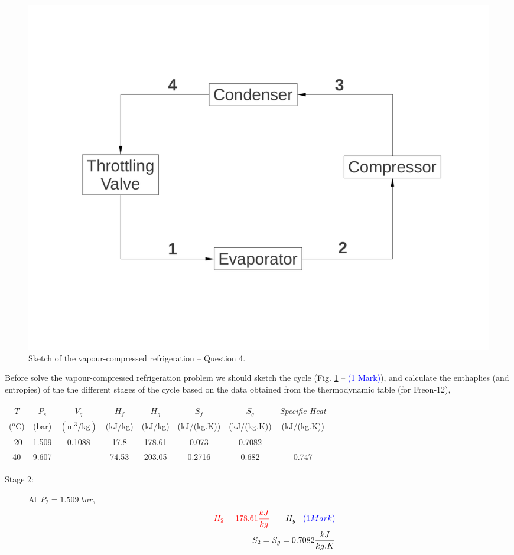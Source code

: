\documentclass[12pt,twoside]{report}
\newcommand{\frc}{\displaystyle\frac}
\begin{document}
\begin{description}
\begin{figure}[h]
\begin{center}
\includegraphics[width=10.cm,clip]{./Pics/Exam_Refrigeration2}
\caption{ Sketch of the vapour-compressed refrigeration -- Question 4.}
\label{exam_refrig2}
\end{center}
\end{figure}

Before solve the vapour-compressed refrigeration problem we should sketch the cycle (Fig. \ref{exam_refrig2} -- \textcolor{blue}{(1 Mark)}), and calculate the enthaplies (and entropies) of the the different stages of the cycle based on the data obtained from the thermodynamic table (for Freon-12),
\begin{center}
\begin{tabular}{|c c| c c c c c c| }
\hline
$T$             & $P_{s}$  & $V_{g}$  & $H_{f}$  & $H_{g}$   &  $S_{f}$   &  $S_{g}$   & {\it Specific Heat} \\
($^{\text{o}}$C)  & (bar)   & $\left(\text{m}^{3}/\text{kg}\right)$ & (kJ/kg) & (kJ/kg) & (kJ/(kg.K)) &  (kJ/(kg.K)) &   (kJ/(kg.K)) \\
\hline
-20   & 1.509 & 0.1088 & 17.8 & 178.61 & 0.073 & 0.7082 & -- \\
40    & 9.607 & --     & 74.53 & 203.05 & 0.2716 & 0.682 & 0.747 \\
\hline
\end{tabular}
\end{center}

\begin{description}
%
\item [Stage 2:] At $P_{2}=1.509\;bar$,
\begin{eqnarray}
&&\textcolor{red}{H_{2}=178.61\frc{kJ}{kg}}\;\;=H_{g}\;\;\;\textcolor{blue}{(1 Mark)} \nonumber \\
&&S_{2}=S_{g}=0.7082 \frc{kJ}{kg.K} \nonumber 
\end{eqnarray}


\end{description}
\end{description}
\end{document}
